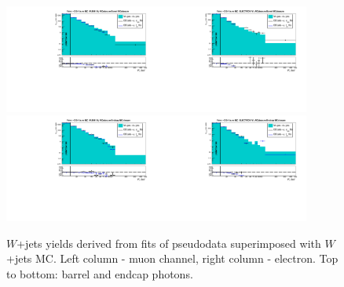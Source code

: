  \begin{figure}[htb]
  \begin{center}
   \includegraphics[width=0.45\textwidth]{../figs/figs_v11/MUON_WGamma/MCclosureWjetsPlusWg/c_FakeDDvsMC_c_MUON_WGamma__UNblind_MCclosure__Barrel__phoEt_MCclosure.pdf}\includegraphics[width=0.45\textwidth]{../figs/figs_v11/ELECTRON_WGamma/MCclosureWjetsPlusWg/c_FakeDDvsMC_c_ELECTRON_WGamma__UNblind_MCclosure__Barrel__phoEt_MCclosure.pdf}
   \includegraphics[width=0.45\textwidth]{../figs/figs_v11/MUON_WGamma/MCclosureWjetsPlusWg/c_FakeDDvsMC_c_MUON_WGamma__UNblind_MCclosure__Endcap__phoEt_MCclosure.pdf}\includegraphics[width=0.45\textwidth]{../figs/figs_v11/ELECTRON_WGamma/MCclosureWjetsPlusWg/c_FakeDDvsMC_c_ELECTRON_WGamma__UNblind_MCclosure__Endcap__phoEt_MCclosure.pdf}
  \caption{$W$+jets yields derived from fits of pseudodata superimposed with $W$+jets MC. Left column - muon channel, right column - electron. Top to bottom: barrel and endcap photons.}
  \label{fig:FakeDDvsMC_MCclosureWjetsPlusWg}
  \end{center}
\end{figure}

